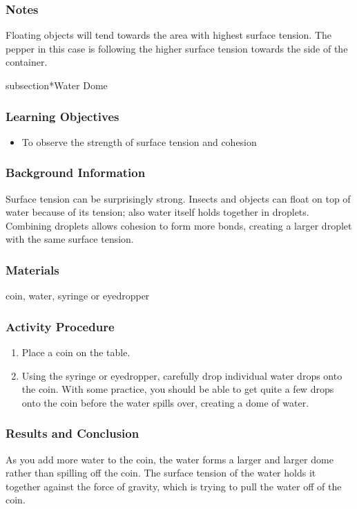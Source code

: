 \subsubsection*{Notes}
Floating objects will tend towards the area with highest surface tension.  The pepper in this case is following the higher surface tension towards the side of the container.

subsection*{Water Dome}

\subsubsection*{Learning Objectives}
\begin{itemize}
\item{To observe the strength of surface tension and cohesion}
\end{itemize}

\subsubsection*{Background Information}
Surface tension can be surprisingly strong.  Insects and objects can float on top of water because of its tension; also water itself holds together in droplets.  Combining droplets allows cohesion to form more bonds, creating a larger droplet with the same surface tension.

\subsubsection*{Materials}
coin, water, syringe or eyedropper

\subsubsection*{Activity Procedure}
\begin{enumerate}
\item{Place a coin on the table.}
\item{Using the syringe or eyedropper, carefully drop individual water drops onto the coin. With some practice, you should be able to get quite a few drops onto the coin before the water spills over, creating a dome of water.}
\end{enumerate}

\subsubsection*{Results and Conclusion}
As you add more water to the coin, the water forms a larger and larger dome rather than spilling off the coin.  The surface tension of the water holds it together against the force of gravity, which is trying to pull the water off of the coin.  

